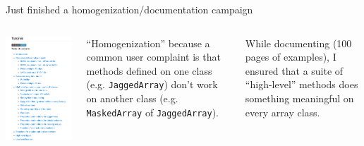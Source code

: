 \documentclass[aspectratio=169]{beamer}
\begin{document}
\begin{frame}{Just finished a homogenization/documentation campaign}
\vspace{0.25 cm}
\begin{columns}
\includegraphics[width=\linewidth]{awkward-documentation.png}

``Homogenization'' because a common user complaint is that methods defined on one class (e.g. {\tt JaggedArray}) don't work on another class (e.g. {\tt MaskedArray} of {\tt JaggedArray}).

\vspace{0.5 cm}
While documenting (100 pages of examples), I ensured that a suite of ``high-level'' methods does something meaningful on every array class.
\end{columns}
\end{frame}
\end{document}
